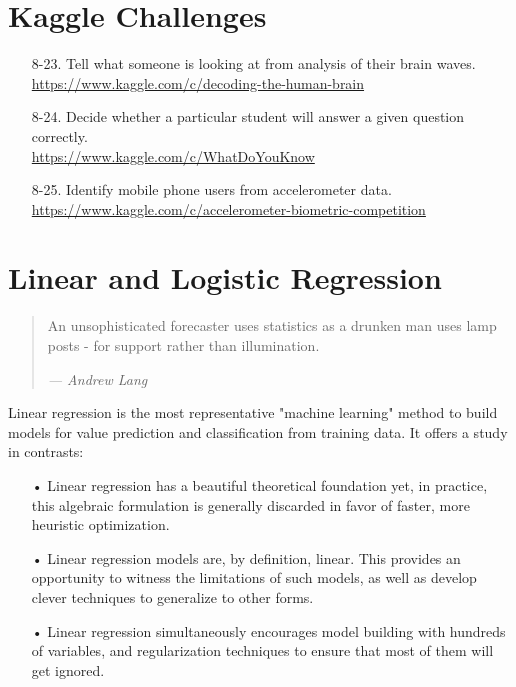 \documentclass[10pt]{article}
\begin{document}
\section{Kaggle Challenges}
\begin{enumerate}
\item[8-23.] Tell what someone is looking at from analysis of their brain waves.\\
\url{https://www.kaggle.com/c/decoding-the-human-brain}

\item[8-24.] Decide whether a particular student will answer a given question correctly.\\
\url{https://www.kaggle.com/c/WhatDoYouKnow}

\item[8-25.] Identify mobile phone users from accelerometer data.\\
\url{https://www.kaggle.com/c/accelerometer-biometric-competition}
\end{enumerate}

\clearpage
\section{Linear and Logistic Regression}
\begin{quote}
An unsophisticated forecaster uses statistics as a drunken man uses lamp posts - for support rather than illumination.
\begin{flushright}
\textit{— Andrew Lang}
\end{flushright}
\end{quote}

Linear regression is the most representative "machine learning" method to build models for value prediction and classification from training data. It offers a study in contrasts:
\begin{itemize}
    \item[•] Linear regression has a beautiful theoretical foundation yet, in practice, this algebraic formulation is generally discarded in favor of faster, more heuristic optimization.
    \item[•] Linear regression models are, by definition, linear. This provides an opportunity to witness the limitations of such models, as well as develop clever techniques to generalize to other forms.
    \item[•] Linear regression simultaneously encourages model building with hundreds of variables, and regularization techniques to ensure that most of them will get ignored.
\end{itemize}
\end{document}
